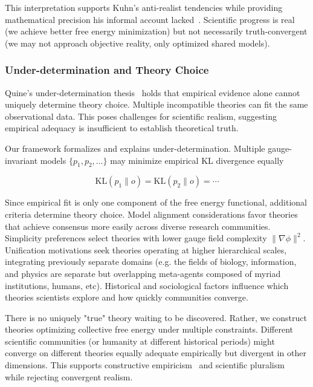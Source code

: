 \documentclass[11pt]{article}
\begin{document}
This interpretation supports Kuhn's anti-realist tendencies while providing mathematical precision his informal account lacked~\cite{Hoyningen-Huene1993}. Scientific progress is real (we achieve better free energy minimization) but not necessarily truth-convergent (we may not approach objective reality, only optimized shared models).

\subsubsection{Under-determination and Theory Choice}

Quine's under-determination thesis~\cite{Quine1951,Quine1975} holds that empirical evidence alone cannot uniquely determine theory choice.  Multiple incompatible theories can fit the same observational data. This poses challenges for scientific realism, suggesting empirical adequacy is insufficient to establish theoretical truth.

Our framework formalizes and explains under-determination. Multiple gauge-invariant models $\{p_1, p_2, \ldots\}$ may minimize empirical KL divergence equally

\begin{equation}
\mathrm{KL}(p_1 \| o) = \mathrm{KL}(p_2 \| o) = \cdots
\end{equation}

Since empirical fit is only one component of the free energy functional, additional criteria determine theory choice. Model alignment considerations favor theories that achieve consensus more easily across diverse research communities. Simplicity preferences select theories with lower gauge field complexity $\|\nabla\phi\|^2$.  Unification motivations seek theories operating at higher hierarchical scales, integrating previously separate domains (e.g. the fields of biology, information, and physics are separate but overlapping meta-agents composed of myriad institutions, humans, etc). Historical and sociological factors influence which theories scientists explore and how quickly communities converge.

There is no uniquely "true" theory waiting to be discovered. Rather, we construct theories optimizing collective free energy under multiple constraints. Different scientific communities (or humanity at different historical periods) might converge on different theories equally adequate empirically but divergent in other dimensions. This supports constructive empiricism~\cite{vanFraassen1980} and scientific pluralism~\cite{Longino2002} while rejecting convergent realism.
\end{document}

